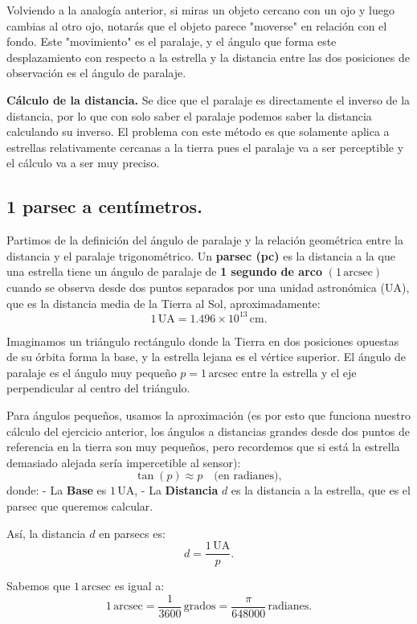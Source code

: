 \documentclass{article}
\begin{document}
Volviendo a la analogía anterior, si miras un objeto cercano con un ojo y luego cambias al otro ojo, notarás que el objeto parece "moverse" en relación con el fondo. Este "movimiento" es el paralaje, y el ángulo que forma este desplazamiento con respecto a la estrella y la distancia entre las dos posiciones de observación es el ángulo de paralaje.

\textbf{Cálculo de la distancia.}
Se dice que el paralaje es directamente el inverso de la distancia, por lo que con solo saber el paralaje podemos saber la distancia calculando su inverso. El problema con este método es que solamente aplica a estrellas relativamente cercanas a la tierra pues el paralaje va a ser perceptible y el cálculo va a ser muy preciso.

\subsection*{1 parsec a centímetros.}
Partimos de la definición del ángulo de paralaje y la relación geométrica entre la distancia y el paralaje trigonométrico. Un \textbf{parsec (pc)} es la distancia a la que una estrella tiene un ángulo de paralaje de \textbf{1 segundo de arco} \( (1 \, \text{arcsec}) \) cuando se observa desde dos puntos separados por una unidad astronómica (UA), que es la distancia media de la Tierra al Sol, aproximadamente:
\[
1 \, \text{UA} = 1.496 \times 10^{13} \, \text{cm}.
\]

Imaginamos un triángulo rectángulo donde la Tierra en dos posiciones opuestas de su órbita forma la base, y la estrella lejana es el vértice superior. El ángulo de paralaje es el ángulo muy pequeño \( p = 1 \, \text{arcsec} \) entre la estrella y el eje perpendicular al centro del triángulo.

Para ángulos pequeños, usamos la aproximación (es por esto que funciona nuestro cálculo del ejercicio anterior, los ángulos a distancias grandes desde dos puntos de referencia en la tierra son muy pequeños, pero recordemos que si está la estrella demasiado alejada sería impercetible al sensor):
\[
\tan(p) \approx p \quad \text{(en radianes)},
\]
donde:
- La \textbf{Base} es \( 1 \, \text{UA} \),
- La \textbf{Distancia} \( d \) es la distancia a la estrella, que es el parsec que queremos calcular.

Así, la distancia \( d \) en parsecs es:
\[
d = \frac{1 \, \text{UA}}{p}.
\]

Sabemos que \( 1 \, \text{arcsec} \) es igual a:
\[
1 \, \text{arcsec} = \frac{1}{3600} \, \text{grados} = \frac{\pi}{648000} \, \text{radianes}.
\]
\end{document}
